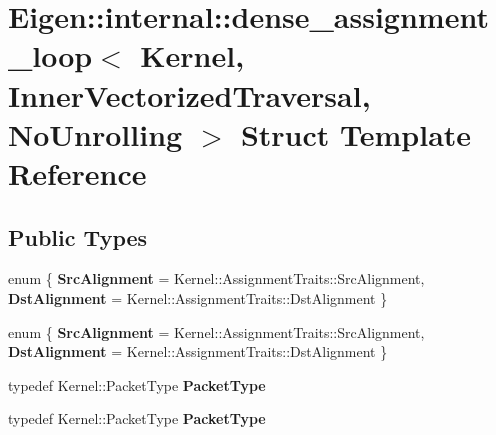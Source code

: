 \hypertarget{struct_eigen_1_1internal_1_1dense__assignment__loop_3_01_kernel_00_01_inner_vectorized_traversal_00_01_no_unrolling_01_4}{}\section{Eigen\+:\+:internal\+:\+:dense\+\_\+assignment\+\_\+loop$<$ Kernel, Inner\+Vectorized\+Traversal, No\+Unrolling $>$ Struct Template Reference}
\label{struct_eigen_1_1internal_1_1dense__assignment__loop_3_01_kernel_00_01_inner_vectorized_traversal_00_01_no_unrolling_01_4}
\subsection*{Public Types}
\begin{DoxyCompactItemize}
\item 
\mbox{\label{struct_eigen_1_1internal_1_1dense__assignment__loop_3_01_kernel_00_01_inner_vectorized_traversal_00_01_no_unrolling_01_4_a14223e4a76e9b5b7b1b4335676ade8cc}} 
enum \{ {\bfseries Src\+Alignment} = Kernel\+:\+:Assignment\+Traits\+:\+:Src\+Alignment, 
{\bfseries Dst\+Alignment} = Kernel\+:\+:Assignment\+Traits\+:\+:Dst\+Alignment
 \}
\item 
\mbox{\label{struct_eigen_1_1internal_1_1dense__assignment__loop_3_01_kernel_00_01_inner_vectorized_traversal_00_01_no_unrolling_01_4_a7a43e134d4e9eddcdb348d132382640e}} 
enum \{ {\bfseries Src\+Alignment} = Kernel\+:\+:Assignment\+Traits\+:\+:Src\+Alignment, 
{\bfseries Dst\+Alignment} = Kernel\+:\+:Assignment\+Traits\+:\+:Dst\+Alignment
 \}
\item 
\mbox{\label{struct_eigen_1_1internal_1_1dense__assignment__loop_3_01_kernel_00_01_inner_vectorized_traversal_00_01_no_unrolling_01_4_a0e154e1ab2f981d932c579fe98be7057}} 
typedef Kernel\+::\+Packet\+Type {\bfseries Packet\+Type}
\item 
\mbox{\label{struct_eigen_1_1internal_1_1dense__assignment__loop_3_01_kernel_00_01_inner_vectorized_traversal_00_01_no_unrolling_01_4_a0e154e1ab2f981d932c579fe98be7057}} 
typedef Kernel\+::\+Packet\+Type {\bfseries Packet\+Type}
\end{DoxyCompactItemize}
